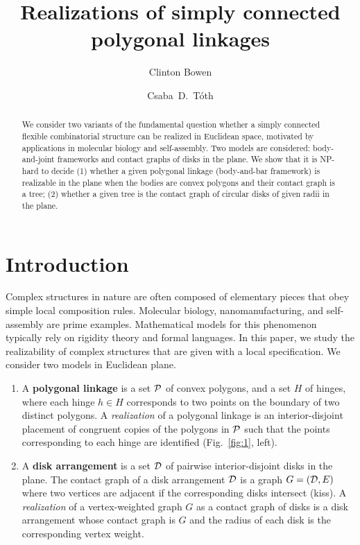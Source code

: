 \documentclass{llncs}
\title{Realizations of simply connected polygonal linkages}
\author{Clinton Bowen\inst{1} \and Csaba~D.~T\'oth\inst{1}}
\institute{Department of Mathematics, California State University, Northridge, CA, USA.\\
\email{clinton.bowen@my.csun.edu csaba.toth@csun.edu}}
\newcommand{\PP}{{\cal P}} %
\newcommand{\DD}{{\cal D}} %
\begin{document}
\linenumbers
\maketitle

\begin{abstract}
We consider two variants of the fundamental question whether a simply connected flexible combinatorial structure can be realized in Euclidean space, motivated by applications in molecular biology and self-assembly. Two models are considered: body-and-joint frameworks and contact graphs of disks in the plane. We show that it is NP-hard to decide (1) whether a given polygonal linkage (body-and-bar framework) is realizable in the plane when the bodies are convex polygons and their contact graph is a tree; (2) whether a given tree is the contact graph of circular disks of given radii in the plane.
\end{abstract}



\section{Introduction}\label{sec:intro}

Complex structures in nature are often composed of elementary pieces that obey simple local composition rules. Molecular biology, nanomanufacturing, and self-assembly are prime examples. Mathematical models for this phenomenon typically rely on rigidity theory and formal languages. In this paper, we study the realizability of complex structures that are given with a local specification. We consider two models in Euclidean plane.

\begin{enumerate}
\item A {\bf polygonal linkage} is a set $\PP$ of convex polygons, and a set $H$ of hinges,
where each hinge $h\in H$ corresponds to two points on the boundary of two distinct polygons.
A \emph{realization} of a polygonal linkage is an interior-disjoint placement of congruent copies of the polygons in $\PP$ such that the points corresponding to each hinge are identified (Fig.~\ref{fig:1}, left).
\item A {\bf disk arrangement} is a set $\DD$ of pairwise interior-disjoint disks in the plane. The contact graph of a disk arrangement $\DD$ is a graph $G=(\DD,E)$ where two vertices are adjacent if the corresponding disks intersect (kiss). A \emph{realization} of a vertex-weighted graph $G$ as a contact graph of disks is a disk arrangement whose contact graph is $G$ and the radius of each disk is the corresponding vertex weight.
\end{enumerate}
\end{document}
